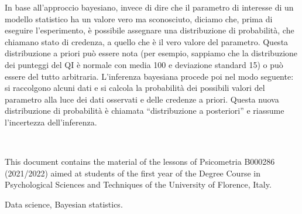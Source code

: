 \documentclass[
  11pt,
  italian,
  a4paper,
  extrafontsizes,onecolumn,openright
  ]{memoir}
\makeatletter
\newcommand{\MemoirChapStyle}{daleif1}
\newcommand{\MemoirPageStyle}{Ruled}
\newlength\widthw %
\newcommand*{\SmallMargins}{
  \setlrmarginsandblock{1.5in}{1.5in}{*}
  \setmarginnotes{0.1in}{0.1in}{0.1in}
 \setulmarginsandblock{1.5in}{1in}{*}
  \checkandfixthelayout
  \ch@ngetext
  \clearpage
  \setlength{\widthw}{\textwidth+\marginparsep+\marginparwidth}
  \footnotesatfoot
  \chapterstyle{\MemoirChapStyle}  %
  \pagestyle{\MemoirPageStyle}
}
\newcommand{\LargeMargins}{\SmallMargins}
\newcommand{\evenpage}{
  \clearpage
  \strictpagecheck %
  \checkoddpage
  \ifoddpage
    \thispagestyle{empty}
    ~\\ %
    \newpage
  \else
  \fi
}
\makeatother
\begin{document}
In base all'approccio bayesiano, invece di dire che il parametro di interesse di un modello statistico ha un valore vero ma sconosciuto, diciamo che, prima di eseguire l'esperimento, è possibile assegnare una distribuzione di probabilità, che chiamano stato di credenza, a quello che è il vero valore del parametro. Questa distribuzione a priori può essere nota (per esempio, sappiamo che la distribuzione dei punteggi del QI è normale con media 100 e deviazione standard 15) o può essere del tutto arbitraria. L'inferenza bayesiana procede poi nel modo seguente: si raccolgono alcuni dati e si calcola la probabilità dei possibili valori del parametro alla luce dei dati osservati e delle credenze a priori. Questa nuova distribuzione di probabilità è chiamata ``distribuzione a posteriori'' e riassume l'incertezza dell'inferenza.



\backmatter
\SmallMargins

\printbibliography
\onecolumn




\cleardoublepage
\LargeMargins
\listoffigures







\evenpage
\SmallMargins
\thispagestyle{empty}

\begin{normalsize}

\begin{description}

\item[Abstract]
This document contains the material of the lessons of Psicometria B000286 (2021/2022) aimed at students of the first year of the Degree Course in Psychological Sciences and Techniques of the University of Florence, Italy.
\item[Keywords]
Data science, Bayesian statistics.
~\\

\end{description}

\end{normalsize}
\end{document}
